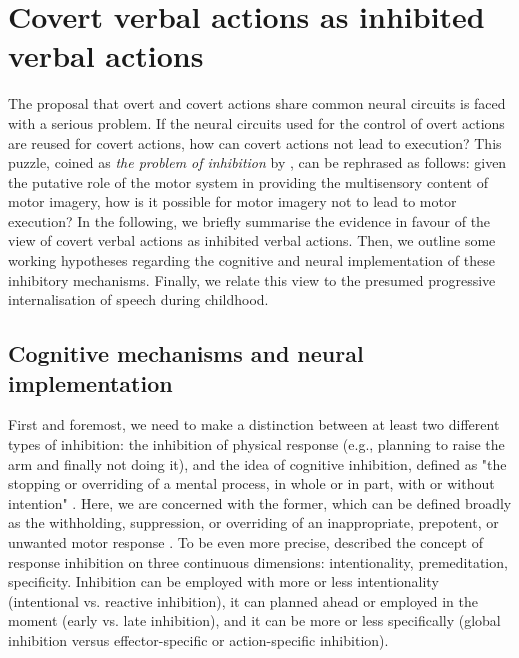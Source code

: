 \documentclass[utf8]{template/frontiersSCNS} %
\begin{document}
\section{Covert verbal actions as inhibited verbal actions}

The proposal that overt and covert actions share common neural circuits is faced with a serious problem. If the neural circuits used for the control of overt actions are reused for covert actions, how can covert actions not lead to execution? This puzzle, coined as \textit{the problem of inhibition} by \cite{jeannerod_neural_2001}, can be rephrased as follows: given the putative role of the motor system in providing the multisensory content of motor imagery, how is it possible for motor imagery not to lead to motor execution? In the following, we briefly summarise the evidence in favour of the view of covert verbal actions as inhibited verbal actions. Then, we outline some working hypotheses regarding the cognitive and neural implementation of these inhibitory mechanisms. Finally, we relate this view to the presumed progressive internalisation of speech during childhood.

\subsection{Cognitive mechanisms and neural implementation}

First and foremost, we need to make a distinction between at least two different types of inhibition: the inhibition of physical response (e.g., planning to raise the arm and finally not doing it), and the idea of cognitive inhibition, defined as "the stopping or overriding of a mental process, in whole or in part, with or without intention" \citep{gorfein_concept_2007}. Here, we are concerned with the former, which can be defined broadly as the withholding, suppression, or overriding of an inappropriate, prepotent, or unwanted motor response \citep{aron_neural_2007, oshea_go_2018}. To be even more precise, \cite{ridderinkhof_dont_2014} described the concept of response inhibition on three continuous dimensions: intentionality, premeditation, specificity. Inhibition can be employed with more or less intentionality (intentional vs. reactive inhibition), it can planned ahead or employed in the moment (early vs. late inhibition), and it can be more or less specifically (global inhibition versus effector-specific or action-specific inhibition).
\end{document}
